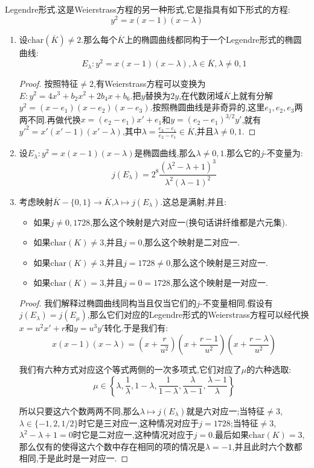 Legendre形式.这是Weierstrass方程的另一种形式,它是指具有如下形式的方程:
$$y^2=x(x-1)(x-\lambda)$$
\begin{enumerate}
	\item 设$\mathrm{char}(\overline{K})\not=2$.那么每个$\overline{K}$上的椭圆曲线都同构于一个Legendre形式的椭圆曲线:
	$$E_{\lambda}:y^2=x(x-1)(x-\lambda),\lambda\in\overline{K},\lambda\not=0,1$$
	\begin{proof}
		
		按照特征$\not=2$,有Weierstrass方程可以变换为$E:y^2=4x^3+b_2x^2+2b_4x+b_6$.把$y$替换为$2y$,在代数闭域$\overline{K}$上就有分解$y^2=(x-e_1)(x-e_2)(x-e_3)$.按照椭圆曲线是非奇异的,这里$e_1,e_2,e_3$两两不同.再做代换$x=(e_2-e_1)x'+e_1$和$y=(e_2-e_1)^{3/2}y'$,就有${y'}^2=x'(x'-1)(x'-\lambda)$,其中$\lambda=\frac{e_3-e_1}{e_2-e_1}\in\overline{K}$,并且$\lambda\not=0,1$.
	\end{proof}
	\item 设$E_{\lambda}:y^2=x(x-1)(x-\lambda)$是椭圆曲线,那么$\lambda\not=0,1$.那么它的$j$-不变量为:
	$$j(E_{\lambda})=2^8\frac{(\lambda^2-\lambda+1)^3}{\lambda^2(\lambda-1)^2}$$
	\item 考虑映射$\overline{K}-\{0,1\}\to\overline{K}$,$\lambda\mapsto j(E_{\lambda})$.这总是满射,并且:
	\begin{itemize}
		\item 如果$j\not=0,1728$,那么这个映射是六对应一(换句话讲纤维都是六元集).
		\item 如果$\mathrm{char}(K)\not=3$,并且$j=0$,那么这个映射是二对应一.
		\item 如果$\mathrm{char}(K)\not=3$,并且$j=1728\not=0$,那么这个映射是三对应一.
		\item 如果$\mathrm{char}(K)=3$,并且$j=0=1728$,那么这个映射是一对应一.
	\end{itemize}
	\begin{proof}
		
		我们解释过椭圆曲线同构当且仅当它们的$j$-不变量相同.假设有$j(E_{\lambda})=j(E_{\mu})$,那么它们对应的Legendre形式的Weierstrass方程可以经代换$x=u^2x'+r$和$y=u^3y'$转化.于是我们有:
		$$x(x-1)(x-\lambda)=\left(x+\frac{r}{u^2}\right)\left(x+\frac{r-1}{u^2}\right)\left(x+\frac{r-\lambda}{u^2}\right)$$
		
		我们有六种方式对应这个等式两侧的一次多项式,它们对应了$\mu$的六种选取:
		$$\mu\in\left\{\lambda,\frac{1}{\lambda},1-\lambda,\frac{1}{1-\lambda},\frac{\lambda}{\lambda-1},\frac{\lambda-1}{\lambda}\right\}$$
		
		所以只要这六个数两两不同,那么$\lambda\mapsto j(E_{\lambda})$就是六对应一;当特征$\not=3$,$\lambda\in\{-1,2,1/2\}$时它是三对应一,这种情况对应于$j=1728$;当特征$\not=3$,$\lambda^2-\lambda+1=0$时它是二对应一,这种情况对应于$j=0$.最后如果$\mathrm{char}(K)=3$,那么仅有的使得这六个数中存在相同的项的情况是$\lambda=-1$,并且此时六个数都相同,于是此时是一对应一.
	\end{proof}
\end{enumerate}
